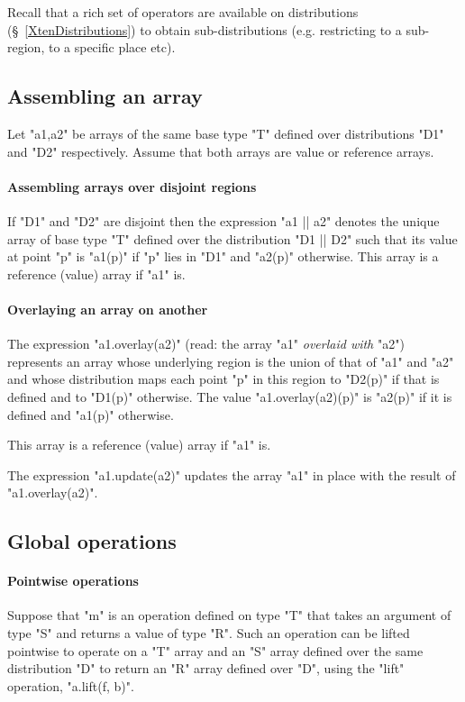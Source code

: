 Recall that a rich set of operators are available on distributions
(\S~\ref{XtenDistributions}) to obtain sub-distributions
(e.g. restricting to a sub-region, to a specific place etc).

\subsection{Assembling an array}
Let \xcd"a1,a2" be arrays of the same base type \xcd"T" defined over
distributions \xcd"D1" and \xcd"D2" respectively. Assume that both
arrays are value or reference arrays. 
\paragraph{Assembling arrays over disjoint regions}

If \xcd"D1" and \xcd"D2" are disjoint then the expression \xcd"a1 || a2" denotes the unique array of base type \xcd"T" defined over the
distribution \xcd"D1 || D2" such that its value at point \xcd"p" is
\xcd"a1(p)" if \xcd"p" lies in \xcd"D1" and \xcd"a2(p)"
otherwise. This array is a reference (value) array if \xcd"a1" is.

\paragraph{Overlaying an array on another}
The expression
\xcd"a1.overlay(a2)" (read: the array \xcd"a1" {\em overlaid with} \xcd"a2")
represents an array whose underlying region is the union of that of
\xcd"a1" and \xcd"a2" and whose distribution maps each point \xcd"p"
in this region to \xcd"D2(p)" if that is defined and to \xcd"D1(p)"
otherwise. The value \xcd"a1.overlay(a2)(p)" is \xcd"a2(p)" if it is defined and \xcd"a1(p)" otherwise.

This array is a reference (value) array if \xcd"a1" is.

The expression \xcd"a1.update(a2)" updates the array \xcd"a1" in place
with the result of \xcd"a1.overlay(a2)".



\subsection{Global operations }
\paragraph{Pointwise operations}\label{ArrayPointwise}
Suppose that \xcd"m" is an operation defined on type \xcd"T" that
takes an argument of type \xcd"S" and returns a value of type
\xcd"R". Such an operation can be lifted pointwise to operate on a \xcd"T"
array and an \xcd"S" array defined over the same distribution \xcd"D"
to return an \xcd"R" array defined over \xcd"D", using the
\xcd"lift" operation, \xcd"a.lift(f, b)".


